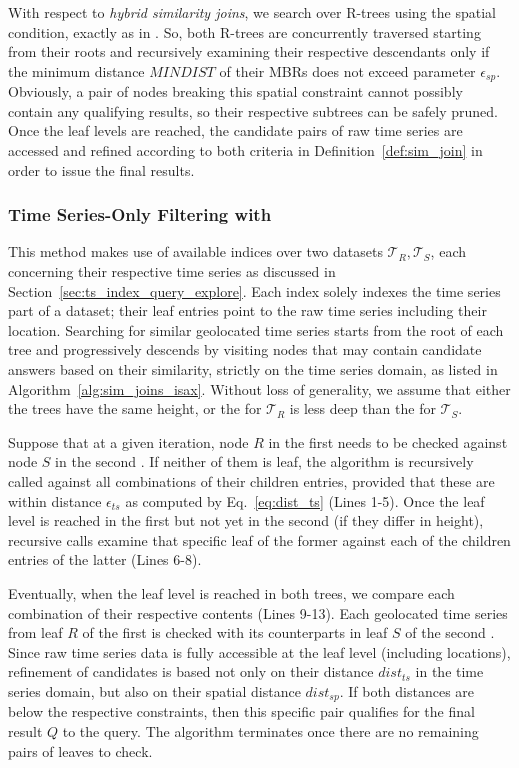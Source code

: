 With respect to {\em hybrid similarity joins}, we search over R-trees using the spatial condition, exactly as in \cite{DBLP:conf/sigmod/BrinkhoffKS93}. So, both R-trees are concurrently traversed starting from their roots and recursively examining their respective descendants only if the minimum distance $MINDIST$ of their MBRs \cite{DBLP:conf/sigmod/RoussopoulosKV95} does not exceed parameter $\epsilon_{sp}$. Obviously, a pair of nodes breaking this spatial constraint cannot possibly contain any qualifying results, so their respective subtrees can be safely pruned. Once the leaf levels are reached, the candidate pairs of raw time series are accessed and refined according to both criteria in Definition~\ref{def:sim_join} in order to issue the final results. 
 
\subsubsection{Time Series-Only Filtering with \isax}
\label{subsubsec:isax_appr}
This method makes use of available \isax indices over two datasets $\mathcal{T}_{R}, \mathcal{T}_{S}$, each concerning their respective time series as discussed in Section~\ref{sec:ts_index_query_explore}. Each \isax index solely indexes the time series part of a dataset; their leaf entries point to the raw time series including their location. Searching for similar geolocated time series starts from the root of each tree and progressively descends by visiting nodes that may contain candidate answers based on their similarity, strictly on the time series domain, as listed in Algorithm~\ref{alg:sim_joins_isax}. Without loss of generality, we assume that either the trees have the same height, or the \isax for $\mathcal{T}_{R}$ is less deep than the \isax for $\mathcal{T}_{S}$.

Suppose that at a given iteration, node $R$ in the first \isax needs to be checked against node $S$ in the second \isax. If neither of them is leaf, the algorithm is recursively called against all combinations of their children entries, provided that these are within distance $\epsilon_{ts}$ as computed by Eq.~\ref{eq:dist_ts} (Lines 1-5). Once the leaf level is reached in the first \isax but not yet in the second \isax (if they differ in height), recursive calls examine that specific leaf of the former against each of the children entries of the latter (Lines 6-8).

Eventually, when the leaf level is reached in both trees, we compare each combination of their respective contents (Lines 9-13). Each geolocated time series from leaf $R$ of the first \isax is checked with its counterparts in leaf $S$ of the second \isax. Since raw time series data is fully accessible at the leaf level (including locations), refinement of candidates is based not only on their distance $dist_{ts}$ in the time series domain, but also on their spatial distance $dist_{sp}$. If both distances are below the respective constraints, then this specific pair qualifies for the final result $Q$ to the query. The algorithm terminates once there are no remaining pairs of leaves to check.

